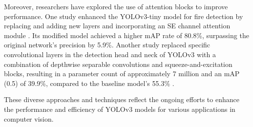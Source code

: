 Moreover, researchers have explored the use of attention blocks to improve performance. One study enhanced the YOLOv3-tiny model for fire detection by replacing and adding new layers and incorporating an SE channel attention module \cite{liFireObjectDetection2022}. Its modified model achieved a higher mAP rate of 80.8\%, surpassing the original network's precision by 5.9\%. Another study replaced specific convolutional layers in the detection head and neck of YOLOv3 with a combination of depthwise separable convolutions and squeeze-and-excitation blocks, resulting in a parameter count of approximately 7 million and an mAP (0.5) of 39.9\%, compared to the baseline model's 55.3\% \cite{sunYoloBasedLightweightObject2023}.

These diverse approaches and techniques reflect the ongoing efforts to enhance the performance and efficiency of YOLOv3 models for various applications in computer vision.
